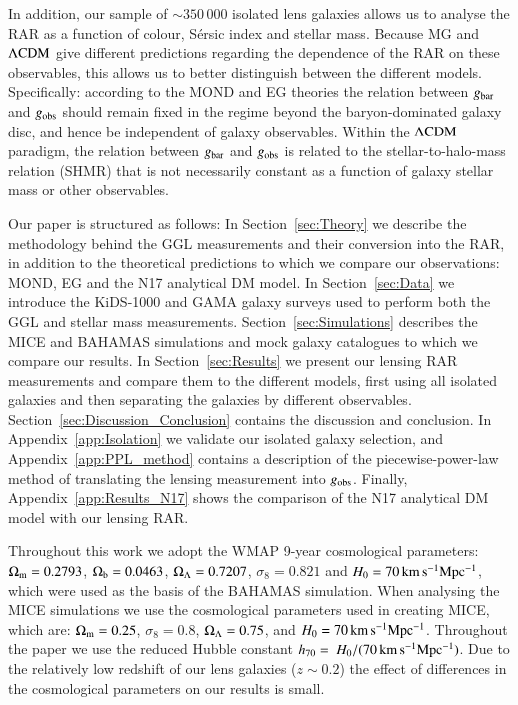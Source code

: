 \documentclass{aa}
\renewcommand{\Upomega}{{\rm \Omega}}
\newcommand{\lcdm}{{\rm \Lambda CDM}}
\newcommand{\un}[1]{_{\rm #1}}
\begin{document}
In addition, our sample of $\sim350\,000$ isolated lens galaxies allows us to analyse the RAR as a function of colour, S\'ersic index and stellar mass. Because MG and $\lcdm$ give different predictions regarding the dependence of the RAR on these observables, this allows us to better distinguish between the different models. Specifically: according to the MOND and EG theories the relation between $g\un{bar}$ and $g\un{obs}$ should remain fixed in the regime beyond the baryon-dominated galaxy disc, and hence be independent of galaxy observables. Within the $\lcdm$ paradigm, the relation between $g\un{bar}$ and $g\un{obs}$ is related to the stellar-to-halo-mass relation (SHMR) that is not necessarily constant as a function of galaxy stellar mass or other observables.

Our paper is structured as follows: In Section~\ref{sec:Theory} we describe the methodology behind the GGL measurements and their conversion into the RAR, in addition to the theoretical predictions to which we compare our observations: MOND, EG and the N17 analytical DM model. In Section~\ref{sec:Data} we introduce the KiDS-1000 and GAMA galaxy surveys used to perform both the GGL and stellar mass measurements. Section~\ref{sec:Simulations} describes the MICE and BAHAMAS simulations and mock galaxy catalogues to which we compare our results. In Section~\ref{sec:Results} we present our lensing RAR measurements and compare them to the different models, first using all isolated galaxies and then separating the galaxies by different observables. Section~\ref{sec:Discussion_Conclusion} contains the discussion and conclusion. In Appendix~\ref{app:Isolation} we validate our isolated galaxy selection, and Appendix~\ref{app:PPL_method} contains a description of the piecewise-power-law method of translating the lensing measurement into $g\un{obs}$. Finally, Appendix~\ref{app:Results_N17} shows the comparison of the N17 analytical DM model with our lensing RAR.

Throughout this work we adopt the WMAP 9-year \cite[]{hinshaw2013} cosmological parameters: $\Upomega\un{m}=0.2793$, $\Upomega\un{b}=0.0463$, $\Upomega\un{\Lambda}=0.7207$, $\sigma_8=0.821$ and $H_0 = 70 \, {\rm km \, s^{-1} Mpc^{-1}}$, which were used as the basis of the BAHAMAS simulation. When analysing the MICE simulations we use the cosmological parameters used in creating MICE, which are: $\Upomega\un{m}=0.25$, $\sigma_8=0.8$, $\Upomega\un{\Lambda}=0.75$, and $H_0 = 70 \, {\rm km \, s^{-1} Mpc^{-1}}$. Throughout the paper we use the reduced Hubble constant $h_{70} = \ H_0 / (70 \, {\rm km \, s^{-1} Mpc^{-1}})$. Due to the relatively low redshift of our lens galaxies ($z\sim0.2$) the effect of differences in the cosmological parameters on our results is small.
\end{document}
